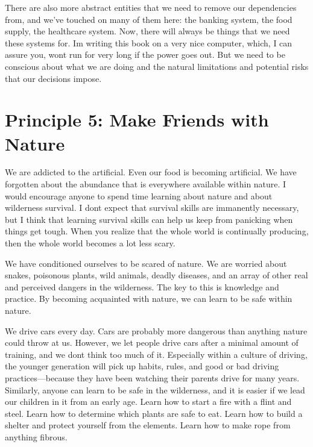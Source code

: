 \documentclass[letterpaper]{article}
\begin{document}
{\color{black}
There are also more abstract entities that we need to remove our
dependencies from\textcolor[rgb]{0.32941177,0.5529412,0.83137256}{, and
we’ve touched on many of them here: the banking system, the food
supply, the healthcare system}. Now, there will always be things that
we need these systems for. I{\textquotesingle}m writing this book on a
very nice computer, which, I can assure you, won{\textquotesingle}t run
for very long if the power goes out. But we need to be conscious about
what we are doing and the natural limitations and potential risks that
\textcolor[rgb]{0.32941177,0.5529412,0.83137256}{our decisions}
impose.}

\section[Principle 5: Make Friends with Nature]{Principle 5: Make
Friends with Nature}
{\color{black}
We are addicted to the artificial. Even our food is becoming artificial.
We have forgotten about the abundance that is everywhere available
within nature. I would encourage anyone to spend time learning about
nature and about wilderness survival. I don{\textquotesingle}t expect
that survival skills are immanently necessary, but I think that
learning survival skills can help us
\textcolor[rgb]{0.32941177,0.5529412,0.83137256}{keep from panicking
}when things get tough. When you realize that the whole world is
continually producing, then the whole world becomes a lot less scary.}

{\color{black}
We have conditioned ourselves to be scared of nature. We are worried
about snakes, poisonous plants, wild animals, deadly diseases, and an
array of other real and perceived dangers in the wilderness. The key to
this is knowledge and practice. By becoming acquainted with nature, we
can learn to be safe within nature. }

{\color{black}
We drive cars every day. Cars are probably more dangerous than anything
nature could throw at us. However, we let people drive cars after a
minimal amount of training, and
\textcolor[rgb]{0.32941177,0.5529412,0.83137256}{we}
don{\textquotesingle}t think too much of it. Especially
\textcolor[rgb]{0.32941177,0.5529412,0.83137256}{within} a culture of
driving, \textcolor[rgb]{0.32941177,0.5529412,0.83137256}{the younger
generation will pick up habits, rules, and good or bad driving
practices—because they have been watching their parents drive for many
years. }Similarly, anyone can learn to be safe in the wilderness, and
it is easier if we lead our children in it from an early age. Learn how
to start a fire with a flint and steel. Learn how to determine which
plants are safe to eat. Learn how to build a shelter and protect
yourself from the elements. Learn how to make rope from anything
fibrous. }
\end{document}
